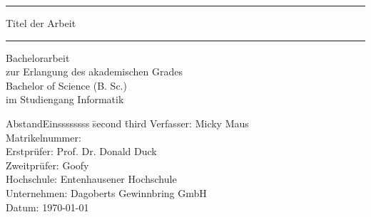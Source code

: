 \begin{titlepage}
\begin{center}
\hrule
\vspace{0.5cm}
\Huge Titel der Arbeit
\vspace{0.5cm}
\hrule
\vspace{2.5cm}
\large Bachelorarbeit\\
\large zur Erlangung des akademischen Grades\\
\large Bachelor of Science (B. Sc.)\\
\large im Studiengang Informatik\\
\end{center}
\vfill
\begin{tabbing}
AbstandEinssssssss \= second \= third \kill
Verfasser: \> Micky Maus\\
Matrikelnummer: \\
Erstprüfer: \> Prof. Dr. Donald Duck\\
Zweitprüfer: \> Goofy\\
Hochschule: \> Entenhausener Hochschule\\
Unternehmen: \> Dagoberts Gewinnbring GmbH\\
Datum: \> \today
\end{tabbing}
\end{titlepage}
